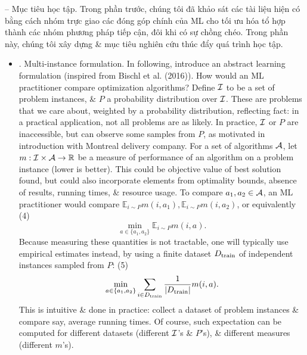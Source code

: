 \documentclass{article}
\begin{document}
\begin{itemize}
    -- {\sf Mục tiêu học tập.} Trong phần trước, chúng tôi đã khảo sát các tài liệu hiện có bằng cách nhóm trực giao các đóng góp chính của ML cho tối ưu hóa tổ hợp thành các nhóm phương pháp tiếp cận, đôi khi có sự chồng chéo. Trong phần này, chúng tôi xây dựng \& mục tiêu nghiên cứu thúc đẩy quá trình học tập.
    \begin{itemize}
        \item {. Multi-instance formulation.} In following, introduce an abstract learning formulation (inspired from Bischl et al. (2016)). How would an ML practitioner compare optimization algorithms? Define ${\cal I}$ to be a set of problem instances, \& $P$ a probability distribution over ${\cal I}$. These are problems that we care about, weighted by a probability distribution, reflecting fact: in a practical application, not all problems are as likely. In practice, ${\cal I}$ or $P$ are inaccessible, but can observe some samples from $P$, as motivated in introduction with Montreal delivery company. For a set of algorithms ${\cal A}$, let $m:{\cal I}\times{\cal A}\to\mathbb{R}$ be a measure of performance of an algorithm on a problem instance (lower is better). This could be objective value of best solution found, but could also incorporate elements from optimality bounds, absence of results, running times, \& resource usage. To compare $a_1,a_2\in{\cal A}$, an ML practitioner would compare $\mathbb{E}_{i\sim P} m(i,a_1),\mathbb{E}_{i\sim P} m(i,a_2)$, or equivalently (4)
        \begin{equation*}
            \min_{a\in\{a_1,a_2\}} \mathbb{E}_{i\sim P} m(i,a).
        \end{equation*}
        Because measuring these quantities is not tractable, one will typically use empirical estimates instead, by using a finite dataset $D_{\rm train}$ of independent instances sampled from $P$: (5)
        \begin{equation*}
            \min_{a\in\{a_1,a_2\}} \sum_{i\in D_{\rm train}} \frac{1}{|D_{\rm train}|}m(i,a).
        \end{equation*}
        This is intuitive \& done in practice: collect a dataset of problem instances \& compare say, average running times. Of course, such expectation can be computed for different datasets (different ${\cal I}$'s \& $P$'s), \& different measures (different $m$'s).


\end{itemize}
\end{itemize}
\end{document}
